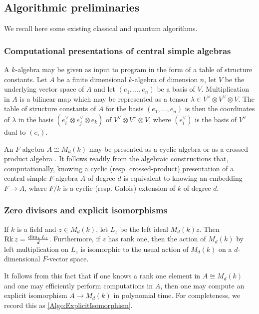 \subsection{Algorithmic preliminaries}\label{Sec:AlgoPrelim}
    We recall here some existing classical and quantum algorithms.
    \subsubsection{Computational presentations of central simple algebras}\label{Sec:Presentations}
        A \(k\)-algebra may be given as input to program in the form of a table of structure constants. Let \(A\) be a finite dimensional \(k\)-algebra of dimension \(n\), let \(V\) be the underlying vector space of \(A\) and let \((e_1,\hdots,e_n)\) be a basis of \(V\). Multiplication in \(A\) is a bilinear map which may be represented as a tensor \(\lambda \in V^\vee \otimes V^\vee \otimes V\). The table of structure constants of \(A\) for the basis \((e_1,\hdots,e_n)\) is then the coordinates of \(\lambda\) in the basis \(\left(e_i^\vee \otimes e_j^\vee \otimes e_k\right)\) of \(V^\vee \otimes V^\vee \otimes V\), where \(\left(e_i^\vee\right)\) is the basis of \(V^\vee\) dual to \((e_i)\).

        An \(F\)-algebra \(A \cong M_d(k)\) may be presented as a cyclic algebra \cite[Section 2.5]{gille2017central} or as a crossed-product algebra \cite[Section 2.6]{jacobson2009finite}. It follows readily from the algebraic constructions that, computationally, knowing a cyclic (resp. crossed-product) presentation of a central simple \(F\)-algebra \(A\) of degree \(d\) is equivalent to knowing an embedding \(F \to A\), where \(F/k\) is a cyclic (resp. Galois) extension of  \(k\) of degree \(d\).
        
    \subsubsection{Zero divisors and explicit isomorphisms}\label{Sec:ZeroDivGivesIsom}
        If \(k\) is a field and \(z \in M_d(k)\), let \(L_z\) be the left ideal \(M_d(k)z\). Then \(\operatorname{Rk} z = \frac{\dim_k L_z}{d}\). Furthermore, if \(z\) has rank one, then the action of \(M_d(k)\) by left multiplication on \(L_z\) is isomorphic to the usual action of \(M_d(k)\) on a \(d\)-dimensional \(F\)-vector space.

        It follows from this fact that if one knows a rank one element in \(A \cong M_d(k)\) and one may efficiently perform computations in \(A\), then one may compute an explicit isomorphism \(A \to M_d(k)\) in polynomial time. For completeness, we record this as \cref{Algo:ExplicitIsomorphism}.

